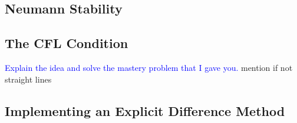 \documentclass{article}
\newcommand{\red}[1]{\textcolor{red}{#1}}
\newcommand{\blue}[1]{\textcolor{blue}{#1}}
\begin{document}
\subsection{Neumann Stability}

 \subsection{The CFL Condition}
\blue{Explain the idea and solve the mastery problem that I gave you.}
 mention if not straight lines
 
\subsection{Implementing an Explicit Difference Method}
\end{document}
